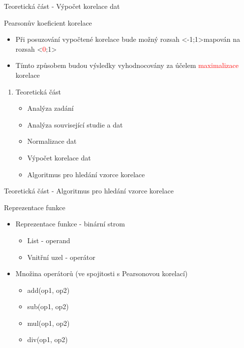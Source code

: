 \documentclass[aspectratio=169, xcolor=dvipsnames]{beamer}
\begin{document}
\begin{frame}{Teoretická část - Výpočet korelace dat}
  \begin{block}{Pearsonův koeficient korelace}
    \begin{itemize}
      \item Při posuzování vypočtené korelace bude možný rozsah \textless-1;1\textgreater mapován na rozsah \textless\textcolor{Red}{0};1\textgreater
      \item Tímto způsobem budou výsledky vyhodnocovány za účelem \textcolor{Red}{maximalizace} korelace 
     \end{itemize} 
  \end{block} 
\end{frame}


\begin{frame}{}
	\begin{center}
  \begin{enumerate}
    \item Teoretická část
      \begin{itemize}
        \item Analýza zadání 
        \item Analýza související studie a dat
        \item Normalizace dat
        \item Výpočet korelace dat
        \item Algoritmus pro hledání vzorce korelace
       \end{itemize}
   \end{enumerate}
	\end{center}
\end{frame}

\begin{frame}{Teoretická část - Algoritmus pro hledání vzorce korelace}
  \begin{block}{Reprezentace funkce}
    \begin{itemize}
        \pause
      \item Reprezentace funkce - binární strom
        \begin{itemize}
          \item List - operand 
          \item Vnitřní uzel - operátor
        \end{itemize}
        \pause
      \item Množina operátorů (ve spojitosti s Pearsonovou korelací)
        \pause
        \begin{itemize}
          \item add(op1, op2)
          \item sub(op1, op2)
          \item mul(op1, op2)
          \item div(op1, op2)
        \end{itemize}
    \end{itemize}
 \end{block} 
\end{frame}
\end{document}
